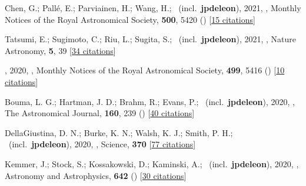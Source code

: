 \item[{\color{numcolor}\scriptsize36}] Chen, G.; Pall{\'e}, E.; Parviainen, H.; Wang, H.; \etal\ (incl.\ \textbf{jpdeleon}), 2021, , Monthly Notices of the Royal Astronomical Society, \textbf{500}, 5420 () [\href{https://ui.adsabs.harvard.edu/abs/2021MNRAS.500.5420C}{15 citations}]

\item[{\color{numcolor}\scriptsize35}] Tatsumi, E.; Sugimoto, C.; Riu, L.; Sugita, S.; \etal\ (incl.\ \textbf{jpdeleon}), 2021, , Nature Astronomy, \textbf{5}, 39 [\href{https://ui.adsabs.harvard.edu/abs/2021NatAs...5...39T}{34 citations}]

\item[{\color{numcolor}\scriptsize34}] , 2020, , Monthly Notices of the Royal Astronomical Society, \textbf{499}, 5416 () [\href{https://ui.adsabs.harvard.edu/abs/2020MNRAS.499.5416C}{10 citations}]

\item[{\color{numcolor}\scriptsize33}] Bouma, L. G.; Hartman, J. D.; Brahm, R.; Evans, P.; \etal\ (incl.\ \textbf{jpdeleon}), 2020, , The Astronomical Journal, \textbf{160}, 239 () [\href{https://ui.adsabs.harvard.edu/abs/2020AJ....160..239B}{40 citations}]

\item[{\color{numcolor}\scriptsize32}] DellaGiustina, D. N.; Burke, K. N.; Walsh, K. J.; Smith, P. H.; \etal\ (incl.\ \textbf{jpdeleon}), 2020, , Science, \textbf{370} [\href{https://ui.adsabs.harvard.edu/abs/2020Sci...370.3660D}{77 citations}]

\item[{\color{numcolor}\scriptsize31}] Kemmer, J.; Stock, S.; Kossakowski, D.; Kaminski, A.; \etal\ (incl.\ \textbf{jpdeleon}), 2020, , Astronomy and Astrophysics, \textbf{642} () [\href{https://ui.adsabs.harvard.edu/abs/2020A&A...642A.236K}{30 citations}]

